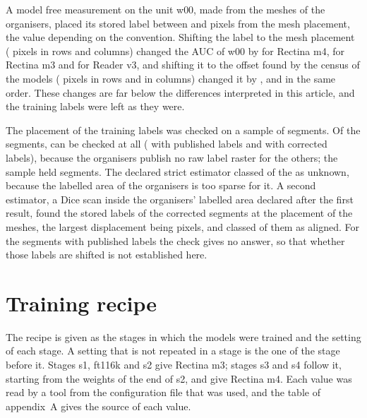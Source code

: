 A model free measurement on the unit w00, made from the meshes of the organisers, placed its stored label between \WOffLow{} and \WOffHigh{} pixels from the mesh placement, the value depending on the convention. Shifting the label to the mesh placement (\WShiftMeshPx{} pixels in rows and columns) changed the AUC of w00 by \WShiftMeshMf{} for Rectina m4, \WShiftMeshMt{} for Rectina m3 and \WShiftMeshV{} for Reader v3, and shifting it to the offset found by the census of the models (\WShiftCensusRows{} pixels in rows and \WShiftCensusCols{} in columns) changed it by \WShiftCensusMf{}, \WShiftCensusMt{} and \WShiftCensusV{} in the same order. These changes are far below the differences interpreted in this article, and the training labels were left as they were.

The placement of the training labels was checked on a sample of segments. Of the \TrainSegN{} segments, \CheckN{} can be checked at all (\CheckPub{} with published labels and \CheckCor{} with corrected labels), because the organisers publish no raw label raster for the others; the sample held \CheckSample{} segments. The declared strict estimator classed \CheckStrictUnknown{} of the \CheckSample{} as unknown, because the labelled area of the organisers is too sparse for it. A second estimator, a Dice scan inside the organisers' labelled area declared after the first result, found the stored labels of the corrected segments at the placement of the meshes, the largest displacement being \CheckMaxPx{} pixels, and classed \CheckDiceAligned{} of them as aligned. For the segments with published labels the check gives no answer, so that whether those labels are shifted is not established here.

\DataAttribution{}

\section{Training recipe}

The recipe is given as the stages in which the models were trained and the setting of each stage. A setting that is not
repeated in a stage is the one of the stage before it. Stages s1, ft116k and s2 give Rectina m3; stages s3 and s4 follow it, starting from the weights of the end of s2, and give Rectina m4. Each value was read by a tool from the configuration file that
was used, and the table of appendix~A gives the source of each value.

